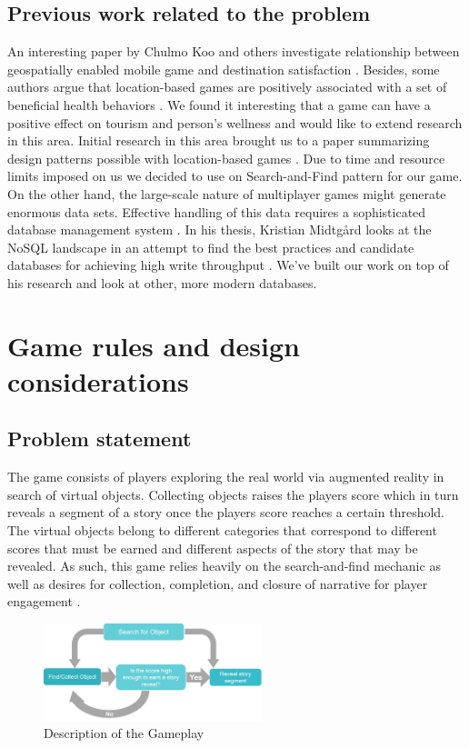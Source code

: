\documentclass[conference]{IEEEtran}
\begin{document}
\subsection{Previous work related to the problem}
An interesting paper by Chulmo Koo and others investigate relationship between geospatially enabled mobile game and destination satisfaction \cite{destination-engagement}. Besides, some authors argue that location-based games are positively associated with a set of beneficial health behaviors \cite{pokemon-motivation}. We found it interesting that a game can have a positive effect on tourism and person’s wellness and would like to extend research in this area.  
   Initial research in this area brought us to a paper summarizing design patterns possible with location-based games \cite{location-based-mg}. Due to time and resource limits imposed on us we decided to use on Search-and-Find pattern for our game. On the other hand, the large-scale nature of multiplayer games might generate enormous data sets. Effective handling of this data requires a sophisticated database management system \cite{data-store-issues, location-based-services}. In his thesis, Kristian Midtgård looks at the NoSQL landscape in an attempt to find the best practices and candidate databases for achieving high write throughput \cite{massive-amounts-location-data}. We've built our work on top of his research and look at other, more modern databases. 

\section{Game rules and design considerations}
\subsection{Problem statement}
The game consists of players exploring the real world via augmented reality in search of virtual objects. Collecting objects raises the players score which in turn reveals a segment of a story once the players score reaches a certain threshold. The virtual objects belong to different categories that correspond to different scores that must be earned and different aspects of the story that may be revealed. As such, this game relies heavily on the search-and-find mechanic as well as desires for collection, completion, and closure of narrative for player engagement \cite{game-methodology, location-based-games}. 

\begin{figure}[h]
\centering
\includegraphics[width=2.5in]{imgs/Gameplay.png}
\caption{Description of the Gameplay}
\label{Gameplay}
\end{figure}
\end{document}

